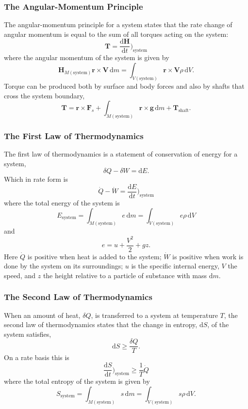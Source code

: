 \subsubsection{The Angular-Momentum Principle}
The angular-momentum principle for a system states that the rate change of angular momentum is equal to the sum of all torques acting on the system:
\[ 
\textbf{T} = \frac{\mathrm{d}\textbf{H}}{\mathrm{d}t} \bigg)_{\mathrm{system}} 
\]
where the angular momentum of the system is given by
\[ 
\textbf{H}_{M(\mathrm{system})} \textbf{r} \times \textbf{V} \, \mathrm{d}m = \int_{V(\mathrm{system})} \textbf{r} \times \textbf{V} \rho \, \mathrm{d}V
.\]
Torque can be produced both by surface and body forces and also by shafts that cross the system boundary,
\[ 
\textbf{T} = \textbf{r} \times \textbf{F}_s + \int _{M(\mathrm{system})} \textbf{r} \times \textbf{g} \, \mathrm{d}m + \textbf{T}_{\mathrm{shaft}}
.\]

\subsubsection{The First Law of Thermodynamics}
The first law of thermodynamics is a statement of conservation of energy for a system,
\[ 
\delta Q - \delta W = \mathrm{d}E
.\]
Which in rate form is
\[ 
\dot{Q} - \dot{W} = \frac{\mathrm{d}E}{\mathrm{d}t}  \bigg)_{\mathrm{system}}
\]
where the total energy of the system is
\[ 
E _{\mathrm{system}} = \int _{M(\mathrm{system})} e \, \mathrm{d}m = \int_{V(\mathrm{system})} e \rho \, \mathrm{d}V
\]
and
\[ 
e = u + \frac{V^2}{2} + gz
.\]
Here $\dot{Q}$ is positive when heat is added to the system; $\dot{W}$ is positive when work is done by the system on its surroundings; $u$ is the specific internal energy, $V$ the speed, and $z$ the height relative to a particle of substance with mass $\mathrm{d}m$.

\subsubsection{The Second Law of Thermodynamics}
When an amount of heat, $\delta Q$, is transferred to a system at temperature $T$, the second law of thermodynamics states that the change in entropy, $\mathrm{d}S$, of the system satisfies,
\[ 
\mathrm{d}S \geq \frac{\delta Q}{T}
.\]
On a rate basis this is
\[ 
\frac{\mathrm{d}S}{\mathrm{d}t} \bigg)_{\mathrm{system}} \geq \frac{1}{T} \dot{Q}
\]
where the total entropy of the system is given by
\[ 
S_{\mathrm{system}} = \int _{M(\mathrm{system})} s \, \mathrm{d}m = \int_{V (\mathrm{system})} s \rho \, \mathrm{d}V
.\]


